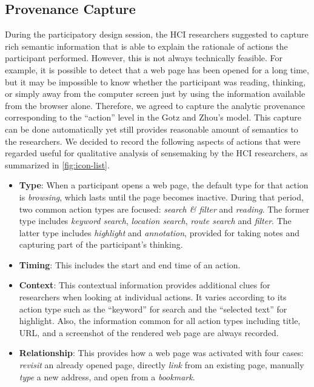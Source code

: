 \subsection{Provenance Capture}
\label{sub:sp-provenance}
During the participatory design session, the HCI researchers suggested to capture rich semantic  information that is able to explain the rationale of actions the participant performed. However, this is not always technically feasible. For example, it is possible to detect that a web page has been opened for a long time, but it may be impossible to know whether the participant was reading, thinking, or simply away from the computer screen just by using the information available from the browser alone. Therefore, we agreed to capture the analytic provenance corresponding to the ``action'' level in the Gotz and Zhou's model. This capture can be done automatically yet still provides reasonable amount of semantics to the researchers. We decided to record the following aspects of actions that were regarded useful for qualitative analysis of sensemaking by the HCI researchers, as summarized in \autoref{fig:icon-list}.

\begin{itemize}
	\item \textbf{Type}: When a participant opens a web page, the default type for that action is \emph{browsing}, which lasts until the page becomes inactive. During that period, two common action types are focused: \emph{search \& filter} and \emph{reading}. The former type includes \emph{keyword search}, \emph{location search}, \emph{route search} and \emph{filter}. The latter type includes \emph{highlight} and \emph{annotation}, provided for taking notes and capturing part of the participant's thinking.

	\item \textbf{Timing}: This includes the start and end time of an action.

	\item \textbf{Context}: This contextual information provides additional clues for researchers when looking at individual actions. It varies according to its action type such as the ``keyword'' for search and the ``selected text'' for highlight. Also, the information common for all action types including title, URL, and a screenshot of the rendered web page are always recorded.

	\item \textbf{Relationship}: This provides how a web page was activated with four cases: \emph{revisit} an already opened page, directly \textit{link} from an existing page, manually \textit{type} a new address, and open from a \emph{bookmark}.
\end{itemize}


